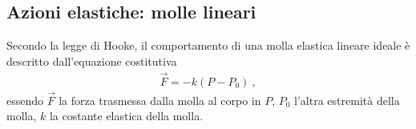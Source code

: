 \documentclass[letterpaper,10pt,italian]{jupyterBook}
\begin{document}
\subsection{Azioni elastiche: molle lineari}
\label{\detokenize{ch/mechanics/actions-examples:azioni-elastiche-molle-lineari}}\label{\detokenize{ch/mechanics/actions-examples:physics-hs-mechanics-actions-gravitation-spring}}
\sphinxAtStartPar
Secondo la legge di Hooke, il comportamento di una molla elastica lineare ideale è descritto dall’equazione costitutiva
\begin{equation}\label{equation:ch/mechanics/actions-examples:eq:spring}
\begin{split}\vec{F} = - k (P - P_0) \ ,\end{split}
\end{equation}
\sphinxAtStartPar
essendo \(\vec{F}\) la forza trasmessa dalla molla al corpo in \(P\), \(P_0\) l’altra estremità della molla, \(k\) la costante elastica della molla.

\sphinxAtStartPar
{} 



\sphinxAtStartPar
{}
\end{document}
